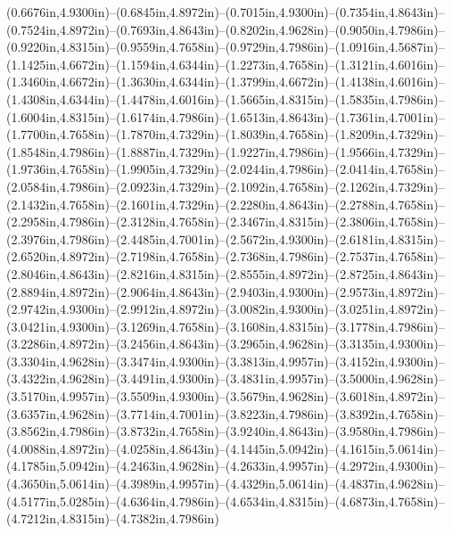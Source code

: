 (0.6676in,4.9300in)--(0.6845in,4.8972in)--(0.7015in,4.9300in)--(0.7354in,4.8643in)--(0.7524in,4.8972in)--(0.7693in,4.8643in)--(0.8202in,4.9628in)--(0.9050in,4.7986in)--(0.9220in,4.8315in)--(0.9559in,4.7658in)--(0.9729in,4.7986in)--(1.0916in,4.5687in)--(1.1425in,4.6672in)--(1.1594in,4.6344in)--(1.2273in,4.7658in)--(1.3121in,4.6016in)--(1.3460in,4.6672in)--(1.3630in,4.6344in)--(1.3799in,4.6672in)--(1.4138in,4.6016in)--(1.4308in,4.6344in)--(1.4478in,4.6016in)--(1.5665in,4.8315in)--(1.5835in,4.7986in)--(1.6004in,4.8315in)--(1.6174in,4.7986in)--(1.6513in,4.8643in)--(1.7361in,4.7001in)--(1.7700in,4.7658in)--(1.7870in,4.7329in)--(1.8039in,4.7658in)--(1.8209in,4.7329in)--(1.8548in,4.7986in)--(1.8887in,4.7329in)--(1.9227in,4.7986in)--(1.9566in,4.7329in)--(1.9736in,4.7658in)--(1.9905in,4.7329in)--(2.0244in,4.7986in)--(2.0414in,4.7658in)--(2.0584in,4.7986in)--(2.0923in,4.7329in)--(2.1092in,4.7658in)--(2.1262in,4.7329in)--(2.1432in,4.7658in)--(2.1601in,4.7329in)--(2.2280in,4.8643in)--(2.2788in,4.7658in)--(2.2958in,4.7986in)--(2.3128in,4.7658in)--(2.3467in,4.8315in)--(2.3806in,4.7658in)--(2.3976in,4.7986in)--(2.4485in,4.7001in)--(2.5672in,4.9300in)--(2.6181in,4.8315in)--(2.6520in,4.8972in)--(2.7198in,4.7658in)--(2.7368in,4.7986in)--(2.7537in,4.7658in)--(2.8046in,4.8643in)--(2.8216in,4.8315in)--(2.8555in,4.8972in)--(2.8725in,4.8643in)--(2.8894in,4.8972in)--(2.9064in,4.8643in)--(2.9403in,4.9300in)--(2.9573in,4.8972in)--(2.9742in,4.9300in)--(2.9912in,4.8972in)--(3.0082in,4.9300in)--(3.0251in,4.8972in)--(3.0421in,4.9300in)--(3.1269in,4.7658in)--(3.1608in,4.8315in)--(3.1778in,4.7986in)--(3.2286in,4.8972in)--(3.2456in,4.8643in)--(3.2965in,4.9628in)--(3.3135in,4.9300in)--(3.3304in,4.9628in)--(3.3474in,4.9300in)--(3.3813in,4.9957in)--(3.4152in,4.9300in)--(3.4322in,4.9628in)--(3.4491in,4.9300in)--(3.4831in,4.9957in)--(3.5000in,4.9628in)--(3.5170in,4.9957in)--(3.5509in,4.9300in)--(3.5679in,4.9628in)--(3.6018in,4.8972in)--(3.6357in,4.9628in)--(3.7714in,4.7001in)--(3.8223in,4.7986in)--(3.8392in,4.7658in)--(3.8562in,4.7986in)--(3.8732in,4.7658in)--(3.9240in,4.8643in)--(3.9580in,4.7986in)--(4.0088in,4.8972in)--(4.0258in,4.8643in)--(4.1445in,5.0942in)--(4.1615in,5.0614in)--(4.1785in,5.0942in)--(4.2463in,4.9628in)--(4.2633in,4.9957in)--(4.2972in,4.9300in)--(4.3650in,5.0614in)--(4.3989in,4.9957in)--(4.4329in,5.0614in)--(4.4837in,4.9628in)--(4.5177in,5.0285in)--(4.6364in,4.7986in)--(4.6534in,4.8315in)--(4.6873in,4.7658in)--(4.7212in,4.8315in)--(4.7382in,4.7986in) 